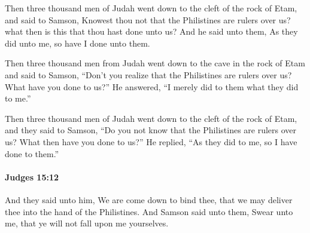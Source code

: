 			\begin{versebox}
					\item[BHS] 
					\item[ASV] Then three thousand men of Judah went down to the cleft of the rock of Etam, and said to Samson, Knowest thou not that the Philistines are rulers over us? what then is this that thou hast done unto us? And he said unto them, As they did unto me, so have I done unto them.
					\item[NIV] Then three thousand men from Judah went down to the cave in the rock of Etam and said to Samson, “Don’t you realize that the Philistines are rulers over us? What have you done to us?” He answered, “I merely did to them what they did to me.”
					\item[NRSV] Then three thousand men of Judah went down to the cleft of the rock of Etam, and they said to Samson, “Do you not know that the Philistines are rulers over us? What then have you done to us?” He replied, “As they did to me, so I have done to them.”
			\end{versebox}

		\paragraph{Judges 15:12} %
			\label{JUDGES-15-12}

			And they said unto him, We are come down to bind thee, that we may deliver thee into the hand of the Philistines. And Samson said unto them, Swear unto me, that ye will not fall upon me yourselves.

